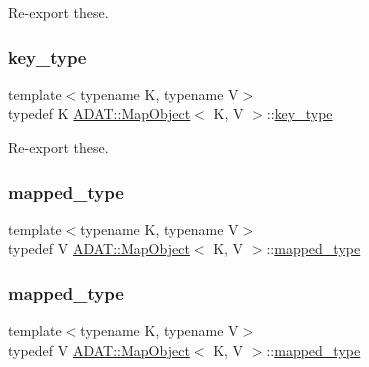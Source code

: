 Re-\/export these. 

\mbox{\label{classADAT_1_1MapObject_a98d458cd1ecd1265ae5451619de933db}} 
\subsubsection{\texorpdfstring{key\_type}{key\_type}\hspace{0.1cm}{\footnotesize\ttfamily [2/2]}}
{\footnotesize\ttfamily template$<$typename K, typename V$>$ \\
typedef K \mbox{\hyperlink{classADAT_1_1MapObject}{A\+D\+A\+T\+::\+Map\+Object}}$<$ K, V $>$\+::\mbox{\hyperlink{classADAT_1_1MapObject_a98d458cd1ecd1265ae5451619de933db}{key\+\_\+type}}}



Re-\/export these. 

\mbox{\label{classADAT_1_1MapObject_ad307fa02da187571a964db1e195a3caa}} 
\subsubsection{\texorpdfstring{mapped\_type}{mapped\_type}\hspace{0.1cm}{\footnotesize\ttfamily [1/2]}}
{\footnotesize\ttfamily template$<$typename K, typename V$>$ \\
typedef V \mbox{\hyperlink{classADAT_1_1MapObject}{A\+D\+A\+T\+::\+Map\+Object}}$<$ K, V $>$\+::\mbox{\hyperlink{classADAT_1_1MapObject_ad307fa02da187571a964db1e195a3caa}{mapped\+\_\+type}}}

\mbox{\label{classADAT_1_1MapObject_ad307fa02da187571a964db1e195a3caa}} 
\subsubsection{\texorpdfstring{mapped\_type}{mapped\_type}\hspace{0.1cm}{\footnotesize\ttfamily [2/2]}}
{\footnotesize\ttfamily template$<$typename K, typename V$>$ \\
typedef V \mbox{\hyperlink{classADAT_1_1MapObject}{A\+D\+A\+T\+::\+Map\+Object}}$<$ K, V $>$\+::\mbox{\hyperlink{classADAT_1_1MapObject_ad307fa02da187571a964db1e195a3caa}{mapped\+\_\+type}}}

